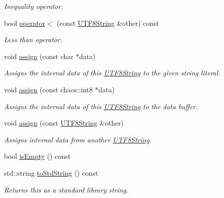 \begin{DoxyCompactItemize}
\begin{DoxyCompactList}\small\item\em Inequality operator. \end{DoxyCompactList}\item 
bool \hyperlink{classchaos_1_1str_1_1_u_t_f8_string_ac7b54ed9c42a9c9a0a386d453d2c1daa}{operator$<$} (const \hyperlink{classchaos_1_1str_1_1_u_t_f8_string}{U\-T\-F8\-String} \&other) const 
\begin{DoxyCompactList}\small\item\em Less than operator. \end{DoxyCompactList}\item 
void \hyperlink{classchaos_1_1str_1_1_u_t_f8_string_a483e71ec1090e346c63bf2b13b37ad7a}{assign} (const char $\ast$data)
\begin{DoxyCompactList}\small\item\em Assigns the internal data of this \hyperlink{classchaos_1_1str_1_1_u_t_f8_string}{U\-T\-F8\-String} to the given string literal. \end{DoxyCompactList}\item 
void \hyperlink{classchaos_1_1str_1_1_u_t_f8_string_a861874ab4bff725c9c10b20a14533221}{assign} (const chaos\-::int8 $\ast$data)
\begin{DoxyCompactList}\small\item\em Assigns the internal data of this \hyperlink{classchaos_1_1str_1_1_u_t_f8_string}{U\-T\-F8\-String} to the data buffer. \end{DoxyCompactList}\item 
void \hyperlink{classchaos_1_1str_1_1_u_t_f8_string_aff351b1a6276e5e59717bc6c3b67818c}{assign} (const \hyperlink{classchaos_1_1str_1_1_u_t_f8_string}{U\-T\-F8\-String} \&other)
\begin{DoxyCompactList}\small\item\em Assigns internal data from another \hyperlink{classchaos_1_1str_1_1_u_t_f8_string}{U\-T\-F8\-String}. \end{DoxyCompactList}\item 
bool \hyperlink{classchaos_1_1str_1_1_u_t_f8_string_a6011a783e7fdc46a39996729651ccd76}{is\-Empty} () const 
\item 
std\-::string \hyperlink{classchaos_1_1str_1_1_u_t_f8_string_a4febd35eab6e30bbcf2bdf38097a2fd6}{to\-Std\-String} () const 
\begin{DoxyCompactList}\small\item\em Returns this as a standard library string. \end{DoxyCompactList}\item 

\end{DoxyCompactItemize}
